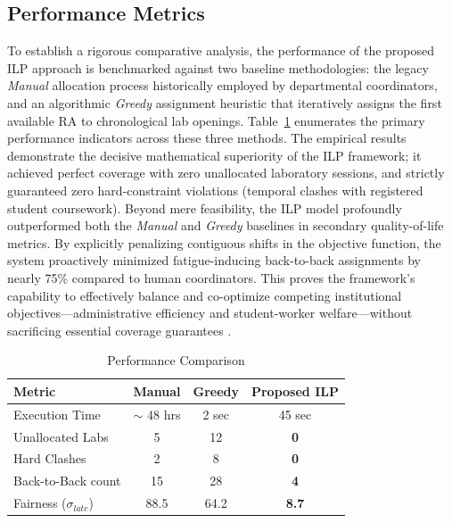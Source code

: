 \documentclass[journal,onecolumn]{IEEEtran}
\begin{document}
\subsection{Performance Metrics}
To establish a rigorous comparative analysis, the performance of the proposed ILP approach is benchmarked against two baseline methodologies: the legacy \textit{Manual} allocation process historically employed by departmental coordinators, and an algorithmic \textit{Greedy} assignment heuristic that iteratively assigns the first available RA to chronological lab openings. Table~\ref{tab:performance} enumerates the primary performance indicators across these three methods. The empirical results demonstrate the decisive mathematical superiority of the ILP framework; it achieved perfect coverage with zero unallocated laboratory sessions, and strictly guaranteed zero hard-constraint violations (temporal clashes with registered student coursework). Beyond mere feasibility, the ILP model profoundly outperformed both the \textit{Manual} and \textit{Greedy} baselines in secondary quality-of-life metrics. By explicitly penalizing contiguous shifts in the objective function, the system proactively minimized fatigue-inducing back-to-back assignments by nearly 75\% compared to human coordinators. This proves the framework's capability to effectively balance and co-optimize competing institutional objectives—administrative efficiency and student-worker welfare—without sacrificing essential coverage guarantees \cite{staff_scheduling, fair_allocation}.

\begin{table}[htbp]
\caption{Performance Comparison}
\label{tab:performance}
\begin{center}
\begin{tabular}{|l|c|c|c|}
\hline
\textbf{Metric} & \textbf{Manual} & \textbf{Greedy} & \textbf{Proposed ILP} \\
\hline
Execution Time & $\sim$ 48 hrs & 2 sec & 45 sec \\
\hline
Unallocated Labs & 5 & 12 & \textbf{0} \\
\hline
Hard Clashes & 2 & 8 & \textbf{0} \\
\hline
Back-to-Back count & 15 & 28 & \textbf{4} \\
\hline
Fairness ($\sigma_{late}$) & 88.5 & 64.2 & \textbf{8.7} \\
\hline
\end{tabular}
\end{center}
\end{table}
\end{document}
